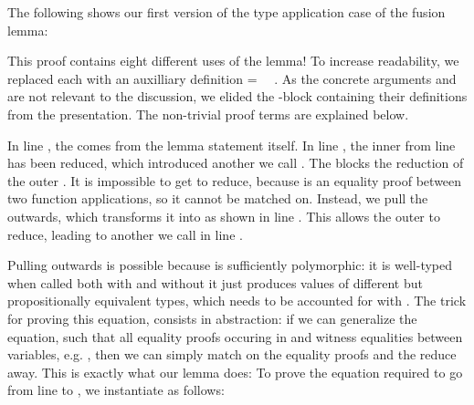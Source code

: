 \documentclass[acmsmall,anonymous,review,screen]{acmart}
\newenvironment{AgdaBlock}{%
  \vspace{\AgdaEmptySkip}%
  \AgdaNoSpaceAroundCode{}%
}{%
  \AgdaSpaceAroundCode{}
}
\begin{document}
The following shows our first version of the type application case
{} of the fusion lemma:

\begin{AgdaBlock}
  \SubstExamplesFusionESubESub
  \SubstExamplesFusionESubESubBody
\end{AgdaBlock}

This proof contains eight different uses of the {\Asubst} lemma!
To increase readability, we replaced each {\Asubst} 
with an auxilliary definition { = \Asubst~~}.
As the concrete arguments {} and {} are not relevant to the
discussion, we elided the -block containing their
definitions from the presentation. The non-trivial proof terms {} are explained below.

In line , the {} comes from the lemma statement itself.
In line , the inner {\AEsub} from line  has been reduced, which
introduced another {\Asubst} we call {}.
The {} blocks the reduction of the outer {\AEsub}.
It is impossible to get {} to reduce, because {} is
an equality proof between two function applications, so it cannot be
matched on.
Instead, we pull the {} outwards, which transforms it into
{} as shown in line . This allows the outer {\AEsub}
to reduce, leading to another {\Asubst} we call {} in line .

Pulling {} outwards is possible because {\AEsub} is sufficiently polymorphic:
it is well-typed when called both with and without {} \textemdash{} it just produces values
of different but propositionally equivalent types, which needs to be accounted for with {}.
The trick for proving this equation, consists in abstraction:
if we can generalize the equation, such that all equality proofs occuring in {}
and  {} witness equalities between variables, e.g. , then
we can simply match on the equality proofs and the {} reduce away.
This is exactly what our {} lemma does:
\SubstExamplesDistSubst
To prove the equation required to go from line  to , we
instantiate {} as follows:
\SubstExamplesFusionESubESubBodyProofA

\end{document}
